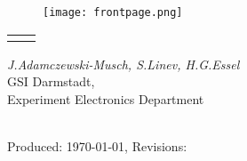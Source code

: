 \documentclass{dabcclass}
\begin{document}
\setcounter{chapter}{1}
\setcounter{section}{0}
\setcounter{subsection}{0}

\begin{figure}[htb]
\centering\texttt{[image: frontpage.png]}
\end{figure}

{\Huge {\bf
\begin{tabular}{p{1.5cm} p{10.0cm}} 
 & \color{FrontLetter}{Introduction}\\
\end{tabular}
}}

\vspace{2cm}

{\em J.Adamczewski-Musch, S.Linev, H.G.Essel} \\
{\large GSI Darmstadt,}\\
Experiment Electronics Department\\\\

\vspace{4cm}

Produced: \today, Revisions:

\cleardoublepage
\thispagestyle{empty} \tableofcontents \thispagestyle{empty} \cleardoublepage
 \cleardoublepage
%
\end{document}

